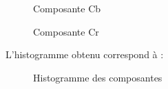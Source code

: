 \documentclass[french,a4paper,10pt]{article}
\begin{document}
\begin{figure}[!htb]
\begin{minipage}{0.3\textwidth}
            \caption{Composante Cb}\label{Fig:peppers_cb}
        \end{minipage}\hfill
        \begin{minipage}{0.3\textwidth}
            \centering
            \caption{Composante Cr}\label{Fig:peppers_cr}
        \end{minipage}
    \end{figure}

    L'histogramme obtenu correspond à :

    \begin{figure}[!htb]
        \begin{minipage}{0.48\textwidth}
            \centering
            \caption{Histogramme des composantes}\label{Fig:peppers_y}
        \end{minipage}\hfill
    \end{figure}
\end{document}
